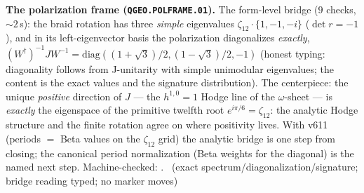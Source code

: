 \documentclass[11pt,a4paper]{article}
\theoremstyle{definition}
\begin{document}
\par\smallskip\noindent\textbf{The polarization frame
(\texttt{QGEO.POLFRAME.01}).}
The form-level bridge ($9$ checks, ${\sim}2$\,s): the braid rotation
has three \emph{simple} eigenvalues $\zeta_{12}\cdot\{1,-1,-i\}$
($\det r=-1$), and in its left-eigenvector basis the polarization
diagonalizes \emph{exactly},
$(W^\dagger)^{-1}JW^{-1}=\mathrm{diag}((1{+}\sqrt3)/2,(1{-}\sqrt3)/2,-1)$
(honest typing: diagonality follows from J-unitarity with simple
unimodular eigenvalues; the content is the exact values and the
signature distribution).  The centerpiece: the unique \emph{positive}
direction of $J$ --- the $h^{1,0}=1$ Hodge line of the
$\omega$-sheet --- is \emph{exactly} the eigenspace of the primitive
twelfth root $e^{i\pi/6}=\zeta_{12}$: the analytic Hodge structure
and the finite rotation agree on where positivity lives.  With v611
(periods $=$ Beta values on the $\zeta_{12}$ grid) the analytic
bridge is one step from closing; the canonical period normalization
(Beta weights for the diagonal) is the named next step.
Machine-checked: .
\mE\ (exact spectrum/diagonalization/signature; bridge reading
typed; no marker moves)
\par\smallskip
\end{document}
